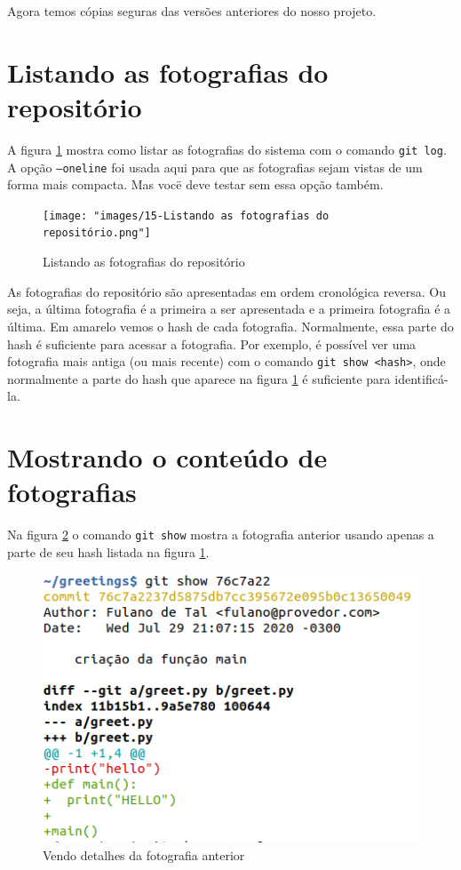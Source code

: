 \documentclass[a4paper]{book}
\begin{document}
Agora temos cópias seguras das versões anteriores
do nosso projeto. 

\newpage
\section{Listando as fotografias do repositório}

A figura \ref{fig:15} mostra como listar as fotografias do 
sistema com o comando \texttt{git log}.
A opção \texttt{--oneline} foi usada aqui para que 
as fotografias sejam vistas de um forma mais compacta.
Mas vocë deve testar sem essa opção também.
%
\begin{figure}[ht]
\caption{Listando as fotografias do repositório}
\label{fig:15}
\centering
\texttt{[image: "images/15-Listando as fotografias do repositório.png"]}
\end{figure}

As fotografias do repositório são apresentadas em ordem cronológica
reversa. Ou seja, a última fotografia é a primeira a ser apresentada
e a primeira fotografia é a última.
Em amarelo vemos o hash de cada fotografia.
Normalmente, essa parte do hash é suficiente para acessar a
fotografia.
Por exemplo, é possível ver uma fotografia mais antiga 
(ou mais recente) com o comando \texttt{git show <hash>},
onde normalmente a parte do hash que aparece na figura
\ref{fig:15} é suficiente para identificá-la.

\newpage
\section{Mostrando o conteúdo de fotografias}

Na figura \ref{fig:16} o comando \texttt{git show}
mostra a fotografia anterior usando apenas a parte de seu hash
listada na figura \ref{fig:15}.

\begin{figure}[ht]
\caption{Vendo detalhes da fotografia anterior}
\label{fig:16}
\centering
\includegraphics[scale=0.6]{"images/16-Vendo detalhes da fotografia anterior.png"}
\end{figure}
\end{document}
